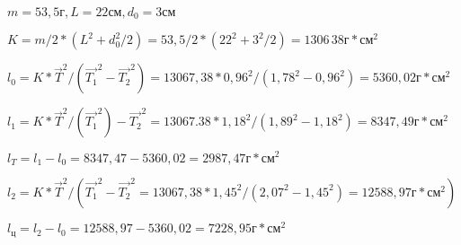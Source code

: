 $m = 53,5 \text{г}, L = 22 \text{см}, d_0 = 3 \text{см}$

$K = m / 2 \ast (L^2 + d_0^2 / 2) = 
53,5 / 2 \ast (22^2 + 3^2 / 2) = 1306\,38 \text{г} \ast \text{см}^2$

$l_0 = K \ast \vec{T}^2 / (\vec{T_1}^2 - \vec{T_2}^2) =
13067,38 \ast 0,96^2 / (1,78^2 - 0,96^2) = 5360,02 \text{г} \ast \text{см}^2$

$l_1 = K \ast \vec{T}^2 / (\vec{T_1}^2) - \vec{T_2}^2 =
13067.38 \ast 1,18^2 / (1,89^2 - 1,18 ^2) =8347,49 \text{г} \ast \text{см}^2$

$l_T = l_1 - l_0 = 8347,47 - 5360,02 = 2987,47 \text{г} \ast \text{см}^2$

$l_2 = K \ast \vec{T}^2 / (\vec{T_1}^2 - \vec{T_2}^2 =
13067,38 \ast 1,45^2 / (2,07^2 - 1,45 ^2) = 12588,97 \text{г} \ast \text{см}^2)$

$l_{\text{ц}} = l_2 - l_0 = 12588,97 - 5360,02 = 7228,95 \text{г} \ast \text{см}^2$

